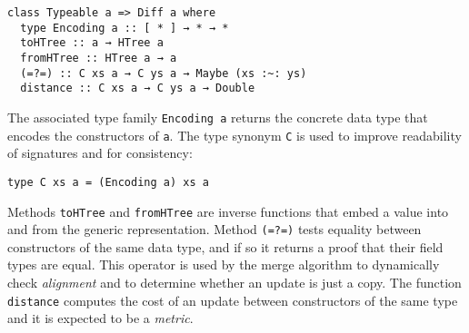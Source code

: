 \documentclass{sigplanconf}
\theoremstyle{plain}
\begin{document}
\begin{verbatim}
class Typeable a => Diff a where
  type Encoding a :: [ * ] → * → *
  toHTree :: a → HTree a
  fromHTree :: HTree a → a
  (=?=) :: C xs a → C ys a → Maybe (xs :~: ys)
  distance :: C xs a → C ys a → Double
\end{verbatim}
The associated type family \texttt{Encoding a} returns the concrete
data type that encodes the constructors of \texttt{a}.
%
The type synonym \texttt{C} is used to improve readability of signatures
and for consistency:
\begin{verbatim}
type C xs a = (Encoding a) xs a
\end{verbatim}
%
Methods \texttt{toHTree} and \texttt{fromHTree} are inverse functions
that embed a value into and from the generic representation.
% 
%
%
%
%
Method \texttt{(=?=)} tests equality between constructors of the same
data type, and if so it returns a proof that their field types are
equal. This operator is used by the merge algorithm to dynamically
check \emph{alignment} and to determine whether an update is just a copy.
%
The function \texttt{distance} computes the cost of an update between
constructors of the same type and it is expected to be a
\emph{metric}.
\end{document}
